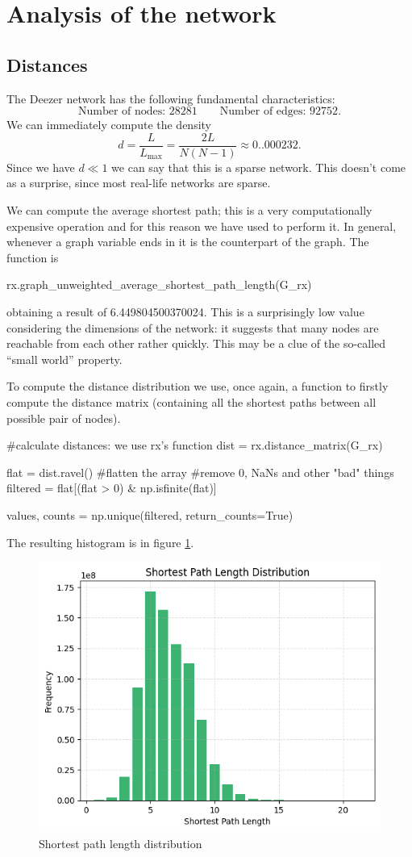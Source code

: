 \documentclass[12pt]{article}
\begin{document}
\section{Analysis of the network}
\subsection{Distances}
The Deezer network has the following fundamental characteristics:
\begin{equation*}
	\text{Number of nodes: }28281\qquad\text{Number of edges: 92752}.
\end{equation*}
We  can immediately compute the density
\begin{equation*}
	d=\frac{L}{L_{\max}}=\frac{2L}{N(N-1)}\approx0..000232.
\end{equation*}
Since we have $d\ll 1$ we can say that this is a sparse network. This doesn't come as a surprise, since most real-life networks are sparse.\par
We can compute the average shortest path; this is a very computationally expensive operation and for this reason we have used  to perform it. In general, whenever a graph variable ends in  it is the  counterpart of the  graph. The function is
\begin{py}
	rx.graph_unweighted_average_shortest_path_length(G_rx)
\end{py}
obtaining a result of 6.449804500370024. This is a surprisingly low value considering the dimensions of the network: it suggests that many nodes are reachable from each other rather quickly. This may be a clue of the so-called ``small world'' property.\par
To compute the distance distribution we use, once again, a  function to firstly compute the distance matrix (containing all the shortest paths between all possible pair of nodes).
\begin{py}
	#calculate distances: we use rx's function 
	dist = rx.distance_matrix(G_rx)
	
	flat = dist.ravel() #flatten the array
	#remove 0, NaNs and other "bad" things
	filtered = flat[(flat > 0) & np.isfinite(flat)]
	
	values, counts = np.unique(filtered, return_counts=True)
\end{py}
The resulting histogram is in figure \ref{fig:screenshot001}.
\begin{figure}[h]
	\centering
	\includegraphics[width=0.6\linewidth]{screenshot001}
	\caption{Shortest path length distribution}
	\label{fig:screenshot001}
\end{figure}
\end{document}
